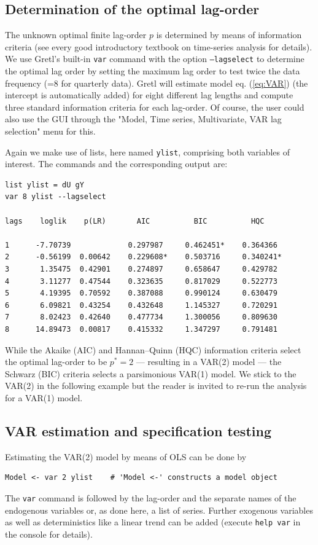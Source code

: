 \documentclass[11pt]{article}
\begin{document}
\subsection{Determination of the optimal lag-order}
The unknown optimal finite lag-order $ p $ is determined by means of information criteria (see every good introductory textbook on time-series analysis for details). We use Gretl's built-in \texttt{var} command with the option \texttt{---lagselect} to determine the optimal lag order by setting the maximum lag order to test twice the data frequency (=8 for quarterly data). Gretl will estimate model eq. (\ref{eq:VAR}) (the intercept is automatically added) for eight different lag lengths and compute three standard information criteria for each lag-order. Of course, the user could also use the GUI through the "Model, Time series, Multivariate, VAR lag selection" menu for this.

Again we make use of lists, here named \texttt{ylist}, comprising both variables of interest. The commands and the corresponding output are:
\begin{Verbatim}[baselinestretch=0.75, fontsize=\small]
list ylist = dU gY
var 8 ylist --lagselect

lags    loglik    p(LR)       AIC          BIC          HQC

1      -7.70739             0.297987     0.462451*    0.364366 
2      -0.56199  0.00642    0.229608*    0.503716     0.340241*
3       1.35475  0.42901    0.274897     0.658647     0.429782 
4       3.11277  0.47544    0.323635     0.817029     0.522773 
5       4.19395  0.70592    0.387088     0.990124     0.630479 
6       6.09821  0.43254    0.432648     1.145327     0.720291 
7       8.02423  0.42640    0.477734     1.300056     0.809630 
8      14.89473  0.00817    0.415332     1.347297     0.791481 
\end{Verbatim}
While the Akaike (AIC) and Hannan–Quinn (HQC) information criteria select the optimal lag-order to be $ p^\ast = 2 $ --- resulting in a VAR(2) model --- the Schwarz (BIC) criteria selects a parsimonious VAR(1) model. We stick to the VAR(2) in the following example but the reader is invited to re-run the analysis for a VAR(1) model.

\subsection{VAR estimation and specification testing}
Estimating the VAR(2) model by means of OLS can be done by
\begin{Verbatim}[baselinestretch=0.75, fontsize=\small]
Model <- var 2 ylist	# 'Model <-' constructs a model object
\end{Verbatim}
The \texttt{var} command is followed by the lag-order and the separate names of the endogenous variables or, as done here, a list of series. Further exogenous variables as well as deterministics like a linear trend can be added (execute \texttt{help var} in the console for details).
\end{document}
